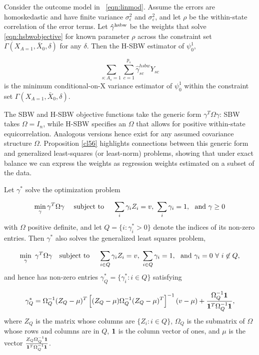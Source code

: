 \begin{proposition}\label{cl4}
    Consider the outcome model in ~\eqref{eqn:linmod}. Assume the errors are homoskedastic and have finite variance $\sigma^2_{\epsilon}$ and $\sigma^2_{\varepsilon}$, and let $\rho$ be the within-state correlation of the error terms. Let $\hat{\gamma}^{\textup{hsbw}}$ be the weights that solve \eqref{eqn:hsbwobjective} for known parameter $\rho$ across the constraint set $\Gamma(X_{A=1}, \bar{X}_0, \delta)$ for any $\delta$. Then the H-SBW estimator of $\psi_0^1$,

    \[\sum_{s: A_s = 1}\sum_{c=1}^{p_s}\hat{\gamma}_{sc}^{hsbw}Y_{sc}\] 
    is the minimum conditional-on-X variance estimator of $\psi_0^1$ within the constraint set $\Gamma(X_{A=1}, \bar{X}_0, \delta)$.
\end{proposition}

The SBW and H-SBW objective functions take the generic form $\gamma^T\Omega\gamma$: SBW takes $\Omega = I_n$, while H-SBW specifies an $\Omega$ that allows for positive within-state equicorrelation. Analogous versions hence exist for any assumed covariance structure $\Omega$. Proposition \ref{cl56} highlights connections between this generic form and generalized least-squares (or least-norm) problems, showing that under exact balance we can express the weights as regression weights estimated on a subset of the data.

\begin{proposition}\label{cl56}
Let $\gamma^*$ solve the optimization problem

\begin{equation}\label{eqn:a1.1}
 \min_\gamma \gamma^T \Omega \gamma \quad \text{ subject to } \quad  \sum_i \gamma_i Z_i = v,\ \sum_i \gamma_i = 1,\ \textup{ and } \gamma \geq 0%
\end{equation}
 with $\Omega$ positive definite, and let $Q = \{i: \gamma^*_i > 0\}$ denote the indices of its non-zero entries. Then $\gamma^*$ also solves the generalized least squares problem,
  
  \begin{equation}\label{eqn:a1.2}
   \min_{\gamma}  \ \gamma^T \Omega \gamma  \quad \textup{subject to }\quad \sum_{i \in Q} \gamma_i Z_i = v,\ \sum_{i \in Q} \gamma_i = 1,\ \textup{ and }   \gamma_i = 0\  \forall\ i \not\in Q,
  \end{equation}
 and hence has non-zero entries $\gamma^*_Q = \{\gamma_i^*: i \in Q\}$ satisfying
 
 \begin{equation}\label{eqn:a1.3}
 \gamma^*_{Q} = \Omega_{Q}^{-1} (Z_{Q} - \mu)^T\left[ (Z_Q - \mu) \Omega_{Q}^{-1} (Z_Q - \mu)^T\right]^{-1} (v - \mu) + \frac{\Omega^{-1}_Q {\bf 1} }{{\bf 1}^T \Omega^{-1}_Q {\bf 1}},
 \end{equation}
where $Z_{Q}$ is the matrix whose columns are $\{Z_i: i \in Q\}$, $\Omega_Q$ is the submatrix of $\Omega$ whose rows and columns are in $Q$, ${\bf 1}$ is the column vector of ones, and $\mu$ is the vector $\frac{Z_{Q}\Omega_{Q}^{-1} {\bf 1}}{ {\bf 1}^T \Omega^{-1}_Q {\bf 1}}$. 
\end{proposition}


